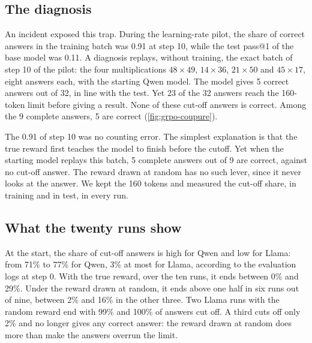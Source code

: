 \subsection{The diagnosis}

An incident exposed this trap. During the learning-rate pilot, the share of correct
answers in the training batch was 0.91 at step 10, while the test pass@1 of the base model was 0.11.
A diagnosis replays, without training, the
exact batch of step 10 of the pilot: the four multiplications $48 \times 49$, $14 \times 36$,
$21 \times 50$ and $45 \times 17$, eight answers each, with the starting Qwen model. The model gives
5 correct answers out of 32, in line with the test. Yet 23 of the 32 answers reach the 160-token
limit before giving a result. None of these cut-off answers is correct. Among the 9 complete
answers, 5 are correct (\cref{fig:grpo-coupure}).



The 0.91 of step 10 was no counting error. The simplest explanation is that the true reward first
teaches the model to finish before the cutoff. Yet when the starting model replays this batch, 5 complete
answers out of 9 are correct, against no cut-off answer. The reward drawn at random has no such lever, since it never looks at the answer. We
kept the 160 tokens and measured the cut-off share, in training and in test, in every run.

\subsection{What the twenty runs show}

At the start, the share of cut-off answers is high for Qwen and low for Llama: from 71\% to 77\% for
Qwen, 3\% at most for Llama, according to the evaluation logs at step 0. With the true reward, over
the ten runs, it ends between 0\% and 29\%. Under the reward drawn at random, it ends above one half in
six runs out of nine, between 2\% and 16\% in the other three. Two Llama runs with the random reward end with
99\% and 100\% of answers cut off. A third cuts off only 2\% and no longer gives any correct
answer: the reward drawn at random does more than make the answers overrun the limit.

